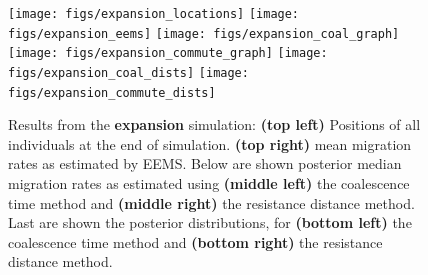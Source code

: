 \documentclass{article}
\newif\ifsubmission
\begin{document}
\begin{figure}
\centering
    \texttt{[image: figs/expansion\_locations]}
    \texttt{[image: figs/expansion\_eems]}
    \texttt{[image: figs/expansion\_coal\_graph]}
    \texttt{[image: figs/expansion\_commute\_graph]}
    \texttt{[image: figs/expansion\_coal\_dists]}
    \texttt{[image: figs/expansion\_commute\_dists]}
    \caption{
        Results from the \textbf{expansion} simulation:
        \textbf{(top left)} Positions of all individuals at the end of simulation.
        \textbf{(top right)} mean migration rates as estimated by EEMS.
        Below are shown
        posterior median migration rates 
            as estimated using 
            \textbf{(middle left)} the coalescence time method and
            \textbf{(middle right)} the resistance distance method.
        Last are shown the posterior distributions, for
            \textbf{(bottom left)} the coalescence time method and
            \textbf{(bottom right)} the resistance distance method.
        \label{sfig:expansion_results}
    }
\end{figure}

\ifsubmission
\processdelayedfloats
\fi

\newpage

\end{document}
